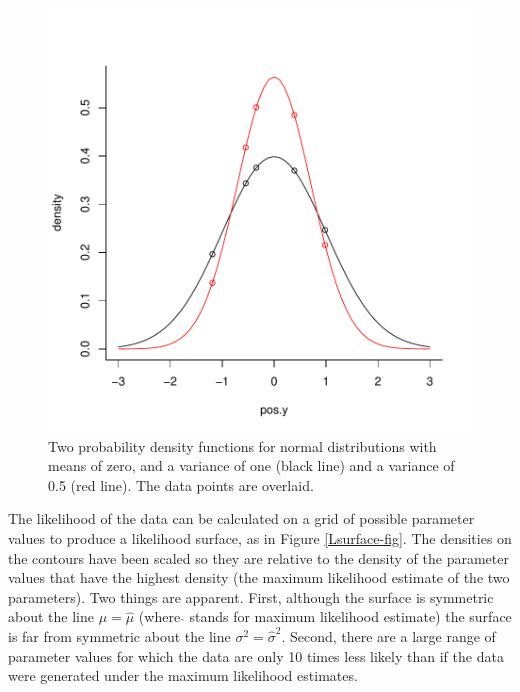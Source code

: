 \documentclass{article}
\begin{document}
\begin{figure}[!h]
\begin{center}
\includegraphics{Lecture1-011}
\end{center}
\caption{Two probability density functions for normal distributions with means of zero, and a variance of one (black line) and a variance of 0.5 (red line).  The data points are overlaid.}
\label{dnorm1-fig}
\end{figure}

The likelihood of the data can be calculated on a grid of possible parameter values to produce a likelihood surface, as in Figure \ref{Lsurface-fig}. The densities on the contours have been scaled so they are relative to the density of the parameter values that have the highest density (the maximum likelihood estimate of the two parameters). Two things are apparent. First, although the surface is symmetric about the line $\mu = \hat{\mu}$ (where $\hat{}$ stands for maximum likelihood estimate) the surface is far from symmetric about the line $\sigma^{2} = \hat{\sigma}^{2}$. Second, there are a large range of parameter values for which the data are only 10 times less likely than if the data were generated under the maximum likelihood estimates.    



\iftalk
\else
\fi
\end{document}
